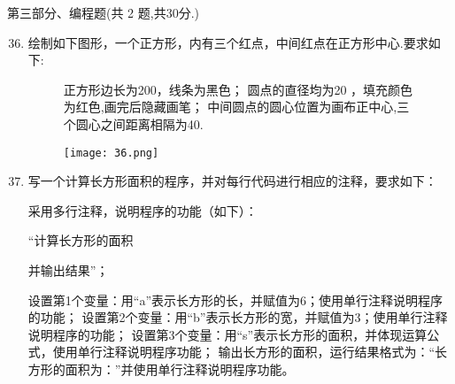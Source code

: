 \documentclass[11pt]{ctexart}
\begin{document}
    \newpage
    {\noindent\heiti 第三部分、编程题(共 2 题,共30分.)}
    \begin{enumerate}
        \setcounter{enumi}{35}
        
        \item 绘制如下图形，一个正方形，内有三个红点，中间红点在正方形中心.要求如下:
        \begin{figure}[htbp]
            \begin{minipage}{.68\textwidth}
                \begin{tasks}[label=(\arabic*)]
                    \task 正方形边长为200，线条为黑色；
                    \task 圆点的直径均为20 ，填充颜色为红色,画完后隐藏画笔；
                    \task 中间圆点的圆心位置为画布正中心,三个圆心之间距离相隔为40.
                \end{tasks}
            \end{minipage}
            \begin{minipage}{.3\textwidth}
                \centering
                \texttt{[image: 36.png]}
            \end{minipage}
        \end{figure}
        \vfill

        \item 写一个计算长方形面积的程序，并对每行代码进行相应的注释，要求如下：
        
        \begin{tasks}[label=(\arabic*)]
            \task 采用多行注释，说明程序的功能（如下）：
            
            “计算长方形的面积
            
            并输出结果”；

            \task 设置第1个变量：用“a”表示长方形的长，并赋值为6；使用单行注释说明程序的功能；
            \task 设置第2个变量：用“b”表示长方形的宽，并赋值为3；使用单行注释说明程序的功能；
            \task 设置第3个变量：用“s”表示长方形的面积，并体现运算公式，使用单行注释说明程序功能；
            \task 输出长方形的面积，运行结果格式为：“长方形的面积为：”并使用单行注释说明程序功能。
        \end{tasks}
        \vfill
    \end{enumerate}
\end{document}
